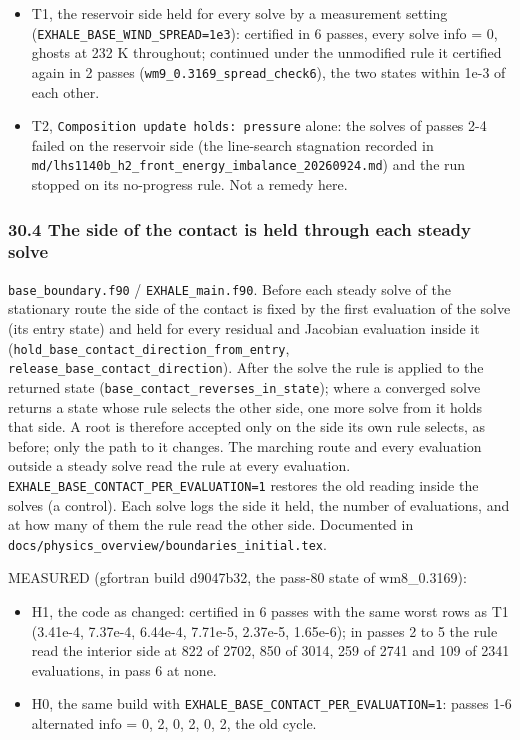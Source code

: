 \documentclass[english,a4paper]{my_memo}
\providecommand{\tightlist}{\setlength{\itemsep}{0pt}\setlength{\parskip}{0pt}}
\begin{document}
\begin{itemize}
\tightlist
\item
  T1, the reservoir side held for every solve by a measurement setting
  (\texttt{EXHALE\_BASE\_WIND\_SPREAD=1e3}): certified in 6 passes, every solve
  info = 0, ghosts at 232 K throughout; continued under the unmodified
  rule it certified again in 2 passes (\texttt{wm9\_0.3169\_spread\_check6}), the two
  states within 1e-3 of each other.
\item
  T2, \texttt{Composition\ update\ holds:\ pressure} alone: the solves of passes 2-4
  failed on the reservoir side (the line-search stagnation recorded in
  \texttt{md/lhs1140b\_h2\_front\_energy\_imbalance\_20260924.md}) and the run stopped
  on its no-progress rule. Not a remedy here.
\end{itemize}

\subsubsection{30.4 The side of the contact is held through each steady solve}\label{304-the-side-of-the-contact-is-held-through-each-steady-solve}

\texttt{base\_boundary.f90} / \texttt{EXHALE\_main.f90}. Before each steady solve of the
stationary route the side of the contact is fixed by the first evaluation
of the solve (its entry state) and held for every residual and Jacobian
evaluation inside it (\texttt{hold\_base\_contact\_direction\_from\_entry},
\texttt{release\_base\_contact\_direction}). After the solve the rule is applied to
the returned state (\texttt{base\_contact\_reverses\_in\_state}); where a converged
solve returns a state whose rule selects the other side, one more solve
from it holds that side. A root is therefore accepted only on the side its
own rule selects, as before; only the path to it changes. The marching
route and every evaluation outside a steady solve read the rule at every
evaluation. \texttt{EXHALE\_BASE\_CONTACT\_PER\_EVALUATION=1} restores the old reading
inside the solves (a control). Each solve logs the side it held, the number
of evaluations, and at how many of them the rule read the other side.
Documented in \texttt{docs/physics\_overview/boundaries\_initial.tex}.

MEASURED (gfortran build d9047b32, the pass-80 state of wm8\_0.3169):

\begin{itemize}
\tightlist
\item
  H1, the code as changed: certified in 6 passes with the same worst rows as
  T1 (3.41e-4, 7.37e-4, 6.44e-4, 7.71e-5, 2.37e-5, 1.65e-6); in passes 2 to
  5 the rule read the interior side at 822 of 2702, 850 of 3014, 259 of 2741
  and 109 of 2341 evaluations, in pass 6 at none.
\item
  H0, the same build with \texttt{EXHALE\_BASE\_CONTACT\_PER\_EVALUATION=1}: passes 1-6
  alternated info = 0, 2, 0, 2, 0, 2, the old cycle.
\end{itemize}
\end{document}
